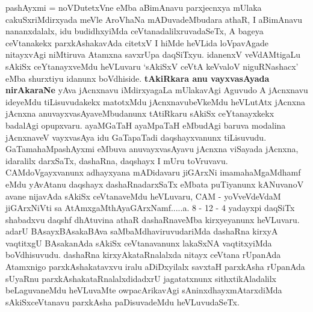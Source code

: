 \begin{artha}
pashAyxmi = noVDutetxVne eMba aBimAnavu parxjecnxya mUlaka cakuSxriMdirxyada meVle AroVhaNa mADuvadeMbudara athaR, I aBimAnavu nananxdalalx, idu budidhxyiMda ceVtanadalilxruvadaSeTx, A bageya ceVtanakekx parxkAshakavAda citetxV I hiMde heVLida loVpavAgade nitayxvAgi niMtiruva Atamxna savxrUpa daqSiTxyu. idanenxV veVdAMtigaLu sAkiSx ceYtanayxveMdu heVLuvaru `sAkiSxV ceVtA keVvaloV niguRNashacx' eMba shurxtiyu idanunx boVdhiside. {\bf tAkiRkara anu vayxvasAyada nirAkaraNe} yAva jAcnxnavu iMdirxyagaLa mUlakavAgi Aguvudo A jAcnxnavu ideyeMdu tiLisuvudakekx matotxMdu jAcnxnavubeVkeMdu heVLutAtx jAcnxna jAcnxna anuvayxvasAyaveMbudanunx tAtiRkaru sAkiSx ceYtanayxkekx badalAgi opupxvaru. ayaMGaTaH ayaMpaTaH eMbudAgi baruva modalina jAcnxnaveV vayxvasAya idu GaTapaTadi daqshayxvanunx tiLisuvudu. GaTamahaMpashAyxmi eMbuva anuvayxvasAyavu jAcnxna viSayada jAcnxna, idaralilx darxSaTx, dashaRna, daqshayx I mUru toVruvavu. CAMdoVgayxvanunx adhayxyana mADidavaru jiGArxNi imamahaMgaMdhamf eMdu yAvAtanu daqshayx dashaRnadarxSaTx eMbata puTiyanunx kANuvanoV avane nijavAda sAkiSx ceVtanaveMdu heVLuvaru, CAM - yoVveVdeVdaM jiGArxNiVti sa AtAmxgaMthAyaGArxNamf.....a. 8 - 12 - 4 yadayxpi daqSiTx shabadxvu daqshf dhAtuvina athaR dashaRnaveMba kirxyeyanunx heVLuvaru. adarU BAsayxBAsakaBAva saMbaMdhaviruvudariMda dashaRna kirxyA vaqtitxgU BAsakanAda sAkiSx ceVtanavanunx lakaSxNA vaqtitxyiMda boVdhisuvudu. dashaRna kirxyAkataRnalalxda nitayx ceVtana rUpanAda Atamxnigo parxkAshakatavxvu iralu aDiDxyilalx savxtaH parxkAsha rUpanAda sUyaRnu parxkAshakataRnalalxdidadxrU jagatatxnunx sithxtikAladalilx beLaguvaneMdu heVLuvaMte owpacArikavAgi sAninxdhayxmAtarxdiMda sAkiSxceVtanavu parxkAsha paDisuvadeMdu heVLuvudaSeTx.
\end{artha}%

